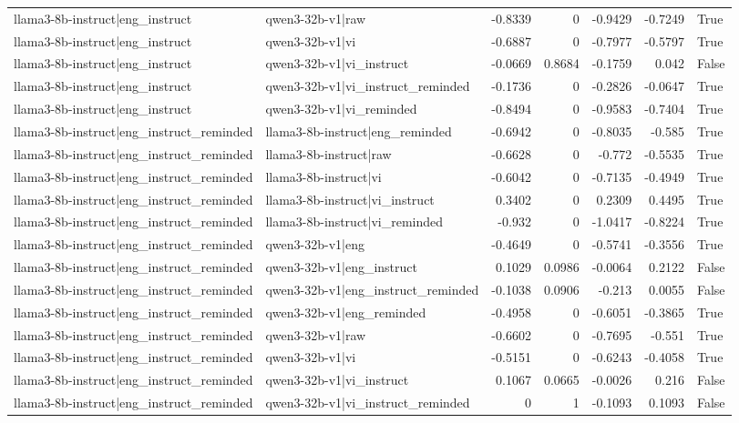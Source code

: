 \begin{table}
\begin{tabular}{l l r r r r l}
llama3-8b-instruct|eng_instruct & qwen3-32b-v1|raw & -0.8339 & 0 & -0.9429 & -0.7249 & True \\
llama3-8b-instruct|eng_instruct & qwen3-32b-v1|vi & -0.6887 & 0 & -0.7977 & -0.5797 & True \\
llama3-8b-instruct|eng_instruct & qwen3-32b-v1|vi_instruct & -0.0669 & 0.8684 & -0.1759 & 0.042 & False \\
llama3-8b-instruct|eng_instruct & qwen3-32b-v1|vi_instruct_reminded & -0.1736 & 0 & -0.2826 & -0.0647 & True \\
llama3-8b-instruct|eng_instruct & qwen3-32b-v1|vi_reminded & -0.8494 & 0 & -0.9583 & -0.7404 & True \\
llama3-8b-instruct|eng_instruct_reminded & llama3-8b-instruct|eng_reminded & -0.6942 & 0 & -0.8035 & -0.585 & True \\
llama3-8b-instruct|eng_instruct_reminded & llama3-8b-instruct|raw & -0.6628 & 0 & -0.772 & -0.5535 & True \\
llama3-8b-instruct|eng_instruct_reminded & llama3-8b-instruct|vi & -0.6042 & 0 & -0.7135 & -0.4949 & True \\
llama3-8b-instruct|eng_instruct_reminded & llama3-8b-instruct|vi_instruct & 0.3402 & 0 & 0.2309 & 0.4495 & True \\
llama3-8b-instruct|eng_instruct_reminded & llama3-8b-instruct|vi_reminded & -0.932 & 0 & -1.0417 & -0.8224 & True \\
llama3-8b-instruct|eng_instruct_reminded & qwen3-32b-v1|eng & -0.4649 & 0 & -0.5741 & -0.3556 & True \\
llama3-8b-instruct|eng_instruct_reminded & qwen3-32b-v1|eng_instruct & 0.1029 & 0.0986 & -0.0064 & 0.2122 & False \\
llama3-8b-instruct|eng_instruct_reminded & qwen3-32b-v1|eng_instruct_reminded & -0.1038 & 0.0906 & -0.213 & 0.0055 & False \\
llama3-8b-instruct|eng_instruct_reminded & qwen3-32b-v1|eng_reminded & -0.4958 & 0 & -0.6051 & -0.3865 & True \\
llama3-8b-instruct|eng_instruct_reminded & qwen3-32b-v1|raw & -0.6602 & 0 & -0.7695 & -0.551 & True \\
llama3-8b-instruct|eng_instruct_reminded & qwen3-32b-v1|vi & -0.5151 & 0 & -0.6243 & -0.4058 & True \\
llama3-8b-instruct|eng_instruct_reminded & qwen3-32b-v1|vi_instruct & 0.1067 & 0.0665 & -0.0026 & 0.216 & False \\
llama3-8b-instruct|eng_instruct_reminded & qwen3-32b-v1|vi_instruct_reminded & 0 & 1 & -0.1093 & 0.1093 & False \\

\end{tabular}
\end{table}
